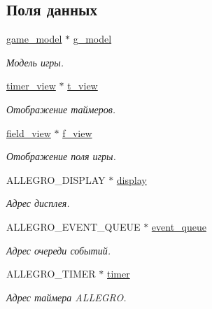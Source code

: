\subsection*{Поля данных}
\begin{DoxyCompactItemize}
\item 
\hyperlink{structgame__model}{game\+\_\+model} $\ast$ \hyperlink{structgame__view_a09b15cc54d9bc6ea5e6d67bd27639b47}{g\+\_\+model}
\begin{DoxyCompactList}\small\item\em Модель игры. \end{DoxyCompactList}\item 
\hyperlink{structtimer__view}{timer\+\_\+view} $\ast$ \hyperlink{structgame__view_a0490cc44940b39d3be15cb3d543988f2}{t\+\_\+view}
\begin{DoxyCompactList}\small\item\em Отображение таймеров. \end{DoxyCompactList}\item 
\hyperlink{structfield__view}{field\+\_\+view} $\ast$ \hyperlink{structgame__view_a1a070c6c14bf9c04398b2aab5609ec81}{f\+\_\+view}
\begin{DoxyCompactList}\small\item\em Отображение поля игры. \end{DoxyCompactList}\item 
A\+L\+L\+E\+G\+R\+O\+\_\+\+D\+I\+S\+P\+L\+AY $\ast$ \hyperlink{structgame__view_ae9721ac01fbc40ea44587bca447a71d3}{display}
\begin{DoxyCompactList}\small\item\em Адрес дисплея. \end{DoxyCompactList}\item 
A\+L\+L\+E\+G\+R\+O\+\_\+\+E\+V\+E\+N\+T\+\_\+\+Q\+U\+E\+UE $\ast$ \hyperlink{structgame__view_a2329d90e0f5234304cc7039e94e9ce33}{event\+\_\+queue}
\begin{DoxyCompactList}\small\item\em Адрес очереди событий. \end{DoxyCompactList}\item 
A\+L\+L\+E\+G\+R\+O\+\_\+\+T\+I\+M\+ER $\ast$ \hyperlink{structgame__view_a331f2383ff30abbee83ed4765cce229a}{timer}
\begin{DoxyCompactList}\small\item\em Адрес таймера A\+L\+L\+E\+G\+RO. \end{DoxyCompactList}\end{DoxyCompactItemize}


